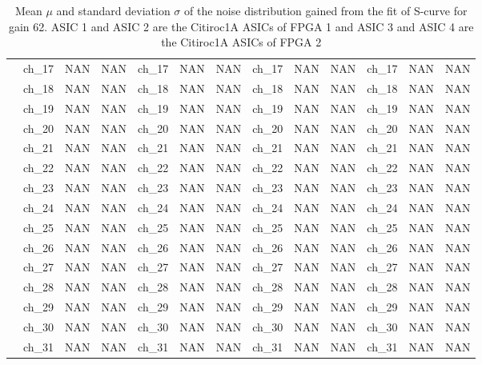 \begin{table}
{\begin{tabular}{|c|c|c|c|c|c|c|c|c|c|c|c|c|}
        &ch\_17 & NAN & NAN & ch\_17 & NAN & NAN & ch\_17 & NAN & NAN & ch\_17 & NAN & NAN \\
        &ch\_18 & NAN & NAN & ch\_18 & NAN & NAN & ch\_18 & NAN & NAN & ch\_18 & NAN & NAN \\
        &ch\_19 & NAN & NAN & ch\_19 & NAN & NAN & ch\_19 & NAN & NAN & ch\_19 & NAN & NAN \\
        &ch\_20 & NAN & NAN & ch\_20 & NAN & NAN & ch\_20 & NAN & NAN & ch\_20 & NAN & NAN \\
        &ch\_21 & NAN & NAN & ch\_21 & NAN & NAN & ch\_21 & NAN & NAN & ch\_21 & NAN & NAN \\
        &ch\_22 & NAN & NAN & ch\_22 & NAN & NAN & ch\_22 & NAN & NAN & ch\_22 & NAN & NAN \\
        &ch\_23 & NAN & NAN & ch\_23 & NAN & NAN & ch\_23 & NAN & NAN & ch\_23 & NAN & NAN \\
        &ch\_24 & NAN & NAN & ch\_24 & NAN & NAN & ch\_24 & NAN & NAN & ch\_24 & NAN & NAN \\
        &ch\_25 & NAN & NAN & ch\_25 & NAN & NAN & ch\_25 & NAN & NAN & ch\_25 & NAN & NAN \\
        &ch\_26 & NAN & NAN & ch\_26 & NAN & NAN & ch\_26 & NAN & NAN & ch\_26 & NAN & NAN \\
        &ch\_27 & NAN & NAN & ch\_27 & NAN & NAN & ch\_27 & NAN & NAN & ch\_27 & NAN & NAN \\
        &ch\_28 & NAN & NAN & ch\_28 & NAN & NAN & ch\_28 & NAN & NAN & ch\_28 & NAN & NAN \\
        &ch\_29 & NAN & NAN & ch\_29 & NAN & NAN & ch\_29 & NAN & NAN & ch\_29 & NAN & NAN \\
        &ch\_30 & NAN & NAN & ch\_30 & NAN & NAN & ch\_30 & NAN & NAN & ch\_30 & NAN & NAN \\
        &ch\_31 & NAN & NAN & ch\_31 & NAN & NAN & ch\_31 & NAN & NAN & ch\_31 & NAN & NAN \\
        \hline
    \end{tabular}
    }
    \caption{Mean $\mu$ and standard deviation $\sigma$ of the noise distribution gained from the fit of S-curve for gain 62. ASIC 1 and ASIC 2 are the Citiroc1A ASICs of FPGA 1 and ASIC 3 and ASIC 4 are the Citiroc1A ASICs of FPGA 2}
    \label{tab:noise_parameter_3}
\end{table}